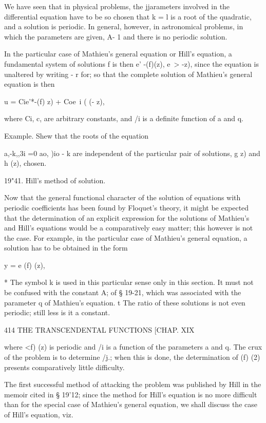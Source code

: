 We have seen that in physical problems, the jjarameters involved in
the differential equation have to be so chosen that k = l is a root of
the quadratic, and a solution is periodic. In general, however, in
astronomical problems, in which the parameters are given, A- 1 and
there is no periodic solution.

In the particular case of Mathieu's general equation or Hill's
equation, a fundamental system of solutions f is then e' -(f)(z), e~>
-z), since the equation is unaltered by writing - r for; so that the
complete solution of Mathieu's general equation is then

u = Cie'*-(f) z) + Coe~i ( (- z),

where Ci, c, are arbitrary constants, and /i is a definite function of
a and q.

Example. Shew that the roots of the equation

a,-k,,3i =0 ao, )io - k are independent of the particular pair of
solutions, g z) and h (z), chosen.

19"41. Hill's method of solution.

Now that the general functional character of the solution of equations
with periodic coefficients has been found by Floquet's theory, it
might be expected that the determination of an explicit expression for
the solutions of Mathieu's and Hill's equations would be a
comparatively easy matter; this however is not the case. For example,
in the particular case of Mathieu's general equation, a solution has
to be obtained in the form

y = e (f) (z),

* The symbol k is used in this particular sense only in this section.
It must not be confused with the constant A; of § 19-21, which was
associated with the parameter q of Mathieu's equation. t The ratio of
these solutions is not even periodic; still less is it a constant.

414 THE TRANSCENDENTAL FUNCTIONS [CHAP. XIX

where <f) (z) is periodic and /i is a function of the parameters a and
q. The crux of the problem is to determine /j.; when this is done,
the determination of (f) (2) presents comparatively little difficulty.

The first successful method of attacking the problem was published by
Hill in the memoir cited in § 19'12; since the method for Hill's
equation is no more difficult than for the special case of Mathieu's
general equation, we shall discuss the case of Hill's equation, viz.

